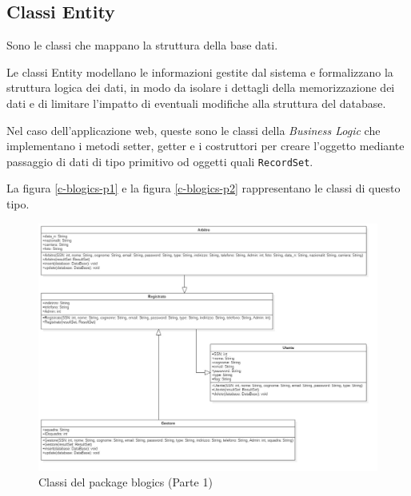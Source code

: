 	\subsection{Classi Entity}
	\label{c4:classi-entity}
	Sono le classi che mappano la struttura della base dati.
	
	Le classi Entity modellano le informazioni gestite dal sistema e formalizzano la struttura logica dei dati, in modo da isolare i dettagli della memorizzazione dei dati e di limitare l'impatto di eventuali modifiche alla struttura del database.
	
	Nel caso dell'applicazione web, queste sono le classi della \emph{Business Logic} che implementano i metodi setter, getter e i costruttori per creare l'oggetto mediante passaggio di dati di tipo primitivo od oggetti quali \texttt{RecordSet}.
	
	La figura \vref{c-blogics-p1} e la figura \vref{c-blogics-p2} rappresentano le classi di questo tipo.
	
	\begin{figure}[h]
		\centering
		\includegraphics[width=1\textwidth]
		{immagini/c-blogics-p1}
		
		\caption{Classi del package blogics (Parte 1)}
		\label{c-blogics-p1}
	\end{figure}

